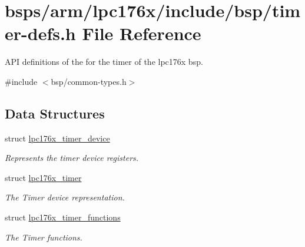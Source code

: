 \hypertarget{timer-defs_8h}{}\section{bsps/arm/lpc176x/include/bsp/timer-\/defs.h File Reference}
\label{timer-defs_8h}


A\+PI definitions of the for the timer of the lpc176x bsp.  


{\ttfamily \#include $<$bsp/common-\/types.\+h$>$}\newline
\subsection*{Data Structures}
\begin{DoxyCompactItemize}
\item 
struct \mbox{\hyperlink{structlpc176x__timer__device}{lpc176x\+\_\+timer\+\_\+device}}
\begin{DoxyCompactList}\small\item\em Represents the timer device registers. \end{DoxyCompactList}\item 
struct \mbox{\hyperlink{structlpc176x__timer}{lpc176x\+\_\+timer}}
\begin{DoxyCompactList}\small\item\em The Timer device representation. \end{DoxyCompactList}\item 
struct \mbox{\hyperlink{structlpc176x__timer__functions}{lpc176x\+\_\+timer\+\_\+functions}}
\begin{DoxyCompactList}\small\item\em The Timer functions. \end{DoxyCompactList}\end{DoxyCompactItemize}

